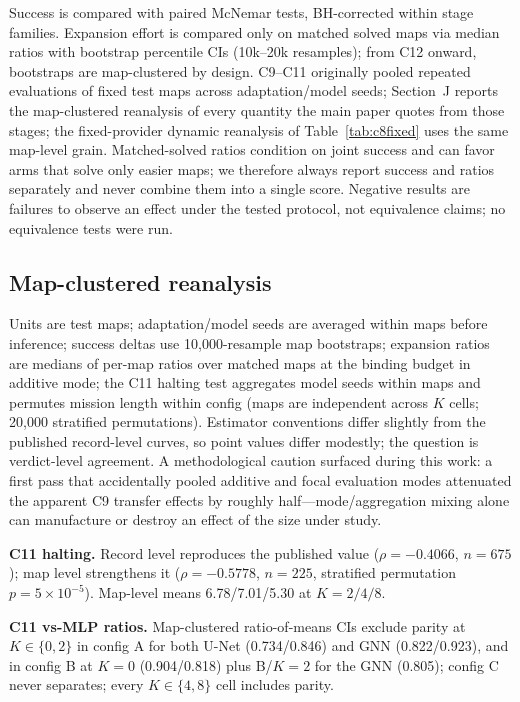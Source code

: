\documentclass[letterpaper]{article} %
\newcommand{\stage}[1]{\textsc{#1}}
\begin{document}
Success is compared with paired McNemar tests, BH-corrected within stage families. Expansion effort is compared only on matched solved maps via median ratios with bootstrap percentile CIs (10k--20k resamples); from \stage{C12} onward, bootstraps are map-clustered by design. \stage{C9}--\stage{C11} originally pooled repeated evaluations of fixed test maps across adaptation/model seeds; Section~J reports the map-clustered reanalysis of every quantity the main paper quotes from those stages; the fixed-provider dynamic reanalysis of Table~\ref{tab:c8fixed} uses the same map-level grain. Matched-solved ratios condition on joint success and can favor arms that solve only easier maps; we therefore always report success and ratios separately and never combine them into a single score. Negative results are failures to observe an effect under the tested protocol, not equivalence claims; no equivalence tests were run.

\subsection{Map-clustered reanalysis}

Units are test maps; adaptation/model seeds are averaged within maps before inference; success deltas use 10{,}000-resample map bootstraps; expansion ratios are medians of per-map ratios over matched maps at the binding budget in additive mode; the \stage{C11} halting test aggregates model seeds within maps and permutes mission length within config (maps are independent across $K$ cells; 20{,}000 stratified permutations). Estimator conventions differ slightly from the published record-level curves, so point values differ modestly; the question is verdict-level agreement. A methodological caution surfaced during this work: a first pass that accidentally pooled additive and focal evaluation modes attenuated the apparent \stage{C9} transfer effects by roughly half---mode/aggregation mixing alone can manufacture or destroy an effect of the size under study.

\textbf{\stage{C11} halting.} Record level reproduces the published value ($\rho{=}-0.4066$, $n{=}675$); map level strengthens it ($\rho{=}-0.5778$, $n{=}225$, stratified permutation $p{=}5{\times}10^{-5}$). Map-level means 6.78/7.01/5.30 at $K{=}2/4/8$.

\textbf{\stage{C11} vs-MLP ratios.} Map-clustered ratio-of-means CIs exclude parity at $K\in\{0,2\}$ in config A for both U-Net (0.734/0.846) and GNN (0.822/0.923), and in config B at $K{=}0$ (0.904/0.818) plus B/$K{=}2$ for the GNN (0.805); config C never separates; every $K\in\{4,8\}$ cell includes parity.
\end{document}
